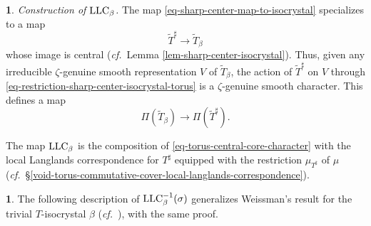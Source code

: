 \documentclass[10pt,english,reqno]{amsart}
\newcommand{\LLC}{\textnormal{LLC}}
\theoremstyle{definition}
\numberwithin{equation}{section}
\newtheorem{untitledsubsubsection}[subsubsection]{}
\newenvironment{void}
{\begin{untitledsubsubsection}}
{\end{untitledsubsubsection}}
\begin{document}

\begin{void}\emph{Construction of $\LLC_{\beta}$.}
The map \eqref{eq-sharp-center-map-to-isocrystal} specializes to a map
\begin{equation}
\label{eq-restriction-sharp-center-isocrystal-torus}
\widetilde T^{\sharp} \rightarrow \widetilde T_{\beta}
\end{equation}
whose image is central (\emph{cf.}~Lemma \ref{lem-sharp-center-isocrystal}). Thus, given any irreducible $\zeta$-genuine smooth representation $V$ of $\widetilde T_{\beta}$, the action of $\widetilde T^{\sharp}$ on $V$ through \eqref{eq-restriction-sharp-center-isocrystal-torus} is a $\zeta$-genuine smooth character. This defines a map
\begin{equation}
\label{eq-torus-central-core-character}
\Pi(\widetilde T_{\beta}) \rightarrow \Pi(\widetilde T^{\sharp}).
\end{equation}

The map $\LLC_{\beta}$ is the composition of \eqref{eq-torus-central-core-character} with the local Langlands correspondence for $T^{\sharp}$ equipped with the restriction $\mu_{T^{\sharp}}$ of $\mu$ (\emph{cf.}~\S\ref{void-torus-commutative-cover-local-langlands-correspondence}).
\end{void}


\begin{void}
The following description of $\LLC_{\beta}^{-1}(\sigma)$ generalizes Weissman's result for the trivial $T$-isocrystal $\beta$ (\emph{cf.}~\cite[Theorem 2.12]{MR3595494}), with the same proof.
\end{void}

\end{document}
